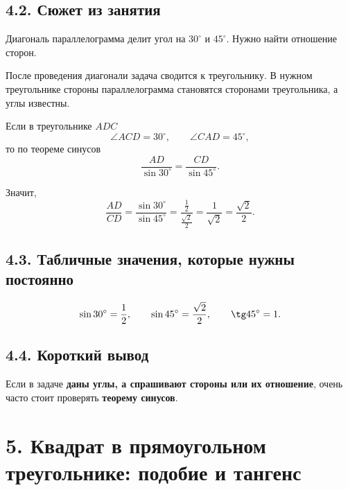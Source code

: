 \documentclass[a4paper,12pt]{article}
\begin{document}
\subsection*{4.2. Сюжет из занятия}

Диагональ параллелограмма делит угол на $30^\circ$ и $45^\circ$. Нужно найти отношение сторон.

После проведения диагонали задача сводится к треугольнику. В нужном треугольнике стороны параллелограмма становятся сторонами треугольника, а углы известны.

Если в треугольнике $ADC$
\[
\angle ACD=30^\circ,\qquad \angle CAD=45^\circ,
\]
то по теореме синусов
\[
\frac{AD}{\sin 30^\circ}=\frac{CD}{\sin 45^\circ}.
\]

Значит,
\[
\frac{AD}{CD}=\frac{\sin 30^\circ}{\sin 45^\circ}
=\frac{\tfrac12}{\tfrac{\sqrt2}{2}}
=\frac{1}{\sqrt2}
=\frac{\sqrt2}{2}.
\]

\subsection*{4.3. Табличные значения, которые нужны постоянно}

\[
\sin 30^\circ=\frac12,\qquad
\sin 45^\circ=\frac{\sqrt2}{2},\qquad
\tg 45^\circ=1.
\]

\subsection*{4.4. Короткий вывод}

Если в задаче \textbf{даны углы, а спрашивают стороны или их отношение}, очень часто стоит проверять \textbf{теорему синусов}.

\begin{center}
\end{center}

\section*{5. Квадрат в прямоугольном треугольнике: подобие и тангенс}
\end{document}

